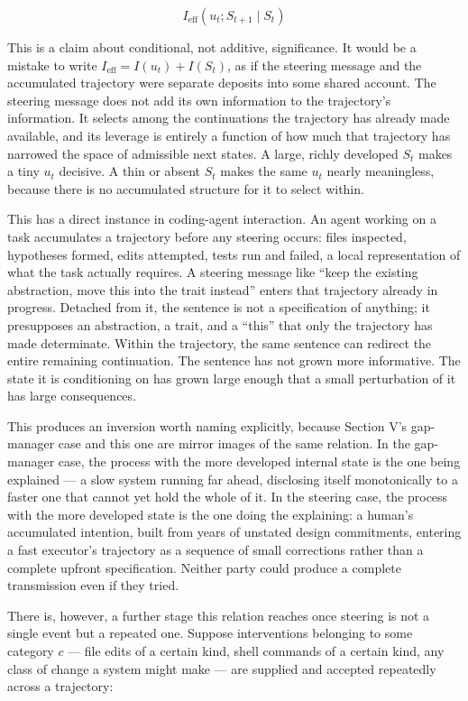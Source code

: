 \documentclass[11pt]{article}
\newcommand{\eff}{\mathrm{eff}}
\begin{document}
\[
I_\eff(u_t; S_{t+1} \mid S_t)
\]

This is a claim about conditional, not additive, significance. It would be a mistake to write $I_\eff = I(u_t) + I(S_t)$, as if the steering message and the accumulated trajectory were separate deposits into some shared account. The steering message does not add its own information to the trajectory's information. It selects among the continuations the trajectory has already made available, and its leverage is entirely a function of how much that trajectory has narrowed the space of admissible next states. A large, richly developed $S_t$ makes a tiny $u_t$ decisive. A thin or absent $S_t$ makes the same $u_t$ nearly meaningless, because there is no accumulated structure for it to select within.

This has a direct instance in coding-agent interaction. An agent working on a task accumulates a trajectory before any steering occurs: files inspected, hypotheses formed, edits attempted, tests run and failed, a local representation of what the task actually requires. A steering message like ``keep the existing abstraction, move this into the trait instead'' enters that trajectory already in progress. Detached from it, the sentence is not a specification of anything; it presupposes an abstraction, a trait, and a ``this'' that only the trajectory has made determinate. Within the trajectory, the same sentence can redirect the entire remaining continuation. The sentence has not grown more informative. The state it is conditioning on has grown large enough that a small perturbation of it has large consequences.

This produces an inversion worth naming explicitly, because Section V's gap-manager case and this one are mirror images of the same relation. In the gap-manager case, the process with the more developed internal state is the one being explained --- a slow system running far ahead, disclosing itself monotonically to a faster one that cannot yet hold the whole of it. In the steering case, the process with the more developed state is the one doing the explaining: a human's accumulated intention, built from years of unstated design commitments, entering a fast executor's trajectory as a sequence of small corrections rather than a complete upfront specification. Neither party could produce a complete transmission even if they tried.

There is, however, a further stage this relation reaches once steering is not a single event but a repeated one. Suppose interventions belonging to some category $c$ --- file edits of a certain kind, shell commands of a certain kind, any class of change a system might make --- are supplied and accepted repeatedly across a trajectory:
\end{document}
